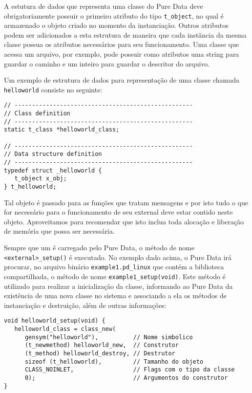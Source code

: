 A estutura de dados que representa uma classe do Pure Data deve
obrigatoriamente possuir o primeiro atributo do tipo \texttt{t\_object}, no
qual é armazenado o objeto criado no momento da instanciação.
Outros atributos podem ser adicionados a esta estrutura de maneira que cada
instância da mesma classe possua os atributos necessários para seu
funcionamento.
Uma classe que acessa um arquivo, por exemplo, pode possuir como atributos uma
string para guardar o caminho e um inteiro para guardar o descritor do
arquivo.

Um exemplo de estrutura de dados para representação de uma classe chamada
\texttt{helloworld} consiste no seguinte:

\vspace{1em}
\begin{lstlisting}[caption=Estruturas de dados de um \external]
// ---------------------------------------------------
// Class definition
// ---------------------------------------------------
static t_class *helloworld_class;

// ---------------------------------------------------
// Data structure definition
// ---------------------------------------------------
typedef struct _helloworld {
   t_object x_obj;
} t_helloworld;
\end{lstlisting}

Tal objeto é passado para as funções que tratam mensagens e por isto tudo o que
for necessário para o funcionamento de seu external deve estar contido neste
objeto.
Aproveitamos para recomendar que isto inclua toda alocação e liberação de
memória que possa ser necessária.

Sempre que um \external é carregado pelo Pure Data, o método de nome
\texttt{<external>\_setup()} é executado. No exemplo dado acima, o Pure
Data irá procurar, no arquivo binário \texttt{example1.pd\_linux} que contém
a biblioteca compartilhada, o método de nome \texttt{example1\_setup(void)}.
Este método é utilizado para realizar a inicialização da classe, informando ao
Pure Data da existência de uma nova classe no sistema e associando a ela os
métodos de instanciação e destruição, além de outras informações:

\vspace{1em}
\begin{lstlisting}[caption=Método setup]
void helloworld_setup(void) {
   helloworld_class = class_new(
      gensym("helloworld"),          // Nome simbolico
      (t_newmethod) helloworld_new,  // Construtor
      (t_method) helloworld_destroy, // Destrutor
      sizeof (t_helloworld),         // Tamanho do objeto
      CLASS_NOINLET,                 // Flags com o tipo da classe
      0);                            // Argumentos do construtor
}
\end{lstlisting}

